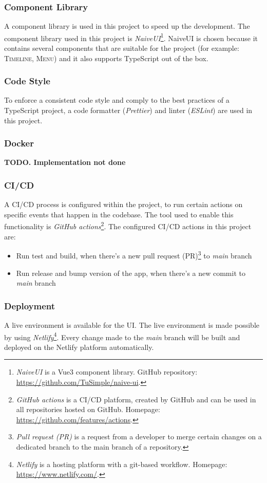   \subsubsection{Component Library}
  A component library is used in this project to speed up the development. The component library used in this project is \emph{NaiveUI}\footnote{\emph{NaiveUI} is a Vue3 component library. GitHub repository: \url{https://github.com/TuSimple/naive-ui}.}. NaiveUI is chosen because it contains several components that are suitable for the project (for example: \textsc{Timeline}, \textsc{Menu}) and it also supports TypeScript out of the box.

  \subsubsection{Code Style}
  To enforce a consistent code style and comply to the best practices of a TypeScript project, a code formatter (\emph{Prettier}) and linter (\emph{ESLint}) are used in this project. 

  \subsubsection{Docker}
  \textbf{TODO. Implementation not done}

  \subsubsection{CI/CD}
  A CI/CD process is configured within the project, to run certain actions on specific events that happen in the codebase. The tool used to enable this functionality is \emph{GitHub actions}\footnote{\emph{GitHub actions} is a CI/CD platform, created by GitHub and can be used in all repositories hosted on GitHub. Homepage: \url{https://github.com/features/actions}.}. The configured CI/CD actions in this project are:

   \begin{itemize}
    \item Run test and build, when there's a new pull request (PR)\footnote{\emph{Pull request (PR)} is a request from a developer to merge certain changes on a dedicated branch to the main branch of a repository.} to \emph{main} branch
    \item Run release and bump version of the app, when there's a new commit to \emph{main} branch
   \end{itemize}
  
  \subsubsection{Deployment}
  A live environment is available for the UI. The live environment is made possible by using \emph{Netlify}\footnote{\emph{Netlify} is a hosting platform with a git-based workflow. Homepage: \url{https://www.netlify.com/}.}. Every change made to the \emph{main} branch will be built and deployed on the Netlify platform automatically. 


